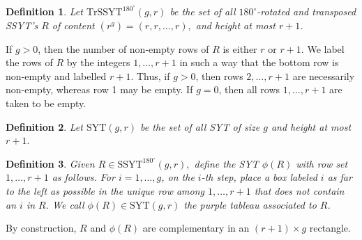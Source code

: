 \documentclass[12pt]{amsart}
\newtheorem{definition}{Definition}[section]
\begin{document}
\begin{definition}
Let $\text{TrSSYT}^{180^\circ}(g,r)$ be the set of all $180^\circ$-rotated and transposed SSYT's $R$ of content $(r^g)=(r,r,\ldots,r),$ and height at most $r+1$. 
\end{definition}

If $g>0$, then the number of non-empty rows of $R$ is either $r$ or $r+1$. We label the rows of $R$ by the integers $1,\ldots,r+1$ in such a way that the bottom row is non-empty and labelled $r+1$. Thus, if $g>0$, then rows $2,\ldots,r+1$ are necessarily non-empty, whereas row 1 may be empty. If $g=0$, then all rows $1,\ldots,r+1$ are taken to be empty.

\begin{definition}
Let $\text{SYT}(g,r)$ be the set of all SYT of size $g$ and height at most $r+1.$
\end{definition}

\begin{definition}\cite[Definition 3.9]{GenRSK}
    Given $R\in \text{SSYT}^{180^\circ}(g,r),$ define the SYT $\phi(R)$ with row set $1,\ldots,r+1$ as follows. For $i=1,\ldots,g$, on the $i$-th step, place a box labeled $i$ as far to the left as possible in the unique row among $1,\ldots,r+1$ that does not contain an $i$ in $R$. We call $\phi(R)\in \text{SYT}(g,r)$ the \emph{purple tableau} associated to $R$.
\end{definition}

By construction, $R$ and $\phi(R)$ are complementary in an $(r+1)\times g$ rectangle.
\end{document}
